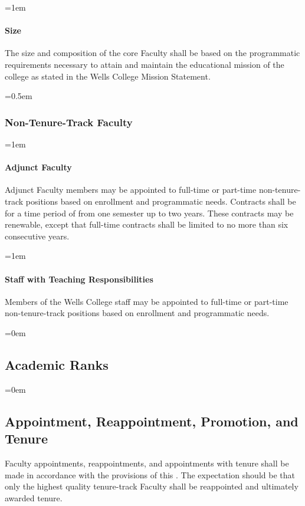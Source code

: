 \documentclass{manual}
\let\oldsubsection\subsection
\renewcommand\subsection{\leftskip=0em\oldsubsection}
\let\oldsubsubsection\subsubsection
\renewcommand\subsubsection{\leftskip=0.5em\oldsubsubsection}
\let\oldparagraph\paragraph
\renewcommand\paragraph{\leftskip=1em\oldparagraph}
\begin{document}
\paragraph{Size} 
The size and composition of the core Faculty shall be based on the programmatic requirements necessary to attain and maintain the educational mission of the college as stated in the Wells College Mission Statement.

\subsubsection{Non-Tenure-Track Faculty}

\paragraph{Adjunct Faculty}

Adjunct Faculty members may be appointed to full-time or part-time non-tenure-track positions based on enrollment and programmatic needs. Contracts shall be for a time period of from one semester up to two years. These contracts may be renewable, except that full-time contracts shall be limited to no more than six consecutive years. 

\paragraph{Staff with Teaching Responsibilities}

Members of the Wells College staff may be appointed to full-time or part-time non-tenure-track positions based on enrollment and programmatic needs.

\subsection{Academic Ranks}


\subsection{Appointment, Reappointment, Promotion, and Tenure}\label{sec:AppointmentReappointmentPromotionAndTenure}
Faculty appointments, reappointments, and appointments with tenure shall be made in accordance with the provisions of this . The expectation should be that only the highest quality tenure-track Faculty shall be reappointed and ultimately awarded tenure.
\end{document}
